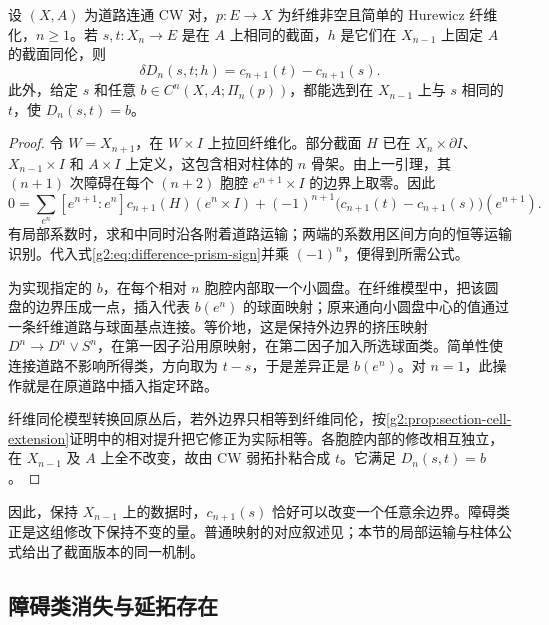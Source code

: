 \begin{proposition}\label{g2:prop:obstruction-difference}
	设 \((X,A)\) 为道路连通 CW 对，\(p:E\to X\) 为纤维非空且简单的 Hurewicz 纤维化，\(n\ge1\)。若 \(s,t:X_n\to E\) 是在 \(A\) 上相同的截面，\(h\) 是它们在 \(X_{n-1}\) 上固定 \(A\) 的截面同伦，则
	\begin{equation}\label{g2:eq:obstruction-difference}
		\delta D_n(s,t;h)=c_{n+1}(t)-c_{n+1}(s).
	\end{equation}
	此外，给定 \(s\) 和任意 \(b\in C^n(X,A;\Pi_n(p))\)，都能选到在 \(X_{n-1}\) 上与 \(s\) 相同的 \(t\)，使 \(D_n(s,t)=b\)。
\end{proposition}
\begin{proof}
	令 \(W=X_{n+1}\)，在 \(W\times I\) 上拉回纤维化。部分截面 \(H\) 已在 \(X_n\times\partial I\)、\(X_{n-1}\times I\) 和 \(A\times I\) 上定义，这包含相对柱体的 \(n\) 骨架。由上一引理，其 \((n+1)\) 次障碍在每个 \((n+2)\) 胞腔 \(e^{n+1}\times I\) 的边界上取零。因此
	\[
		0=\sum_{e^n}[e^{n+1}:e^n]c_{n+1}(H)(e^n\times I)
		+(-1)^{n+1}\bigl(c_{n+1}(t)-c_{n+1}(s)\bigr)(e^{n+1}).
	\]
	有局部系数时，求和中同时沿各附着道路运输；两端的系数用区间方向的恒等运输识别。代入式\eqref{g2:eq:difference-prism-sign}并乘 \((-1)^n\)，便得到所需公式。

	为实现指定的 \(b\)，在每个相对 \(n\) 胞腔内部取一个小圆盘。在纤维模型中，把该圆盘的边界压成一点，插入代表 \(b(e^n)\) 的球面映射；原来通向小圆盘中心的值通过一条纤维道路与球面基点连接。等价地，这是保持外边界的挤压映射 \(D^n\to D^n\vee S^n\)，在第一因子沿用原映射，在第二因子加入所选球面类。简单性使连接道路不影响所得类，方向取为 \(t-s\)，于是差异正是 \(b(e^n)\)。对 \(n=1\)，此操作就是在原道路中插入指定环路。

	纤维同伦模型转换回原丛后，若外边界只相等到纤维同伦，按\cref{g2:prop:section-cell-extension}证明中的相对提升把它修正为实际相等。各胞腔内部的修改相互独立，在 \(X_{n-1}\) 及 \(A\) 上全不改变，故由 CW 弱拓扑粘合成 \(t\)。它满足 \(D_n(s,t)=b\)。
\end{proof}

因此，保持 \(X_{n-1}\) 上的数据时，\(c_{n+1}(s)\) 恰好可以改变一个任意余边界。障碍类正是这组修改下保持不变的量。普通映射的对应叙述见\cite[第18章第5节，Obstruction theory]{May1999}；本节的局部运输与柱体公式给出了截面版本的同一机制。

\subsection{障碍类消失与延拓存在}
\label{g2:subsec:1202:04}

